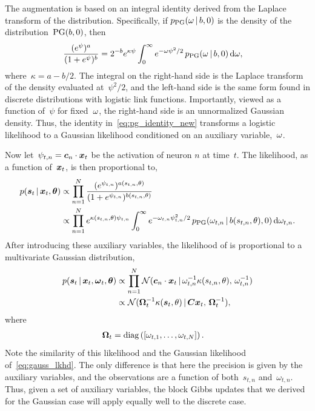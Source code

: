 The augmentation is based on an integral identity
derived from the Laplace transform of the \polyagamma distribution.
Specifically, if $p_{\mathrm{PG}}({\omega}\,|\, b, 0)$ is the
density of the \polyagamma distribution~${\mathrm{PG}(b, 0)}$,
then
\begin{align}
  \frac{(e^{\psi})^a}{(1+e^{\psi})^b}
  &= 2^{-b} e^{\kappa \psi}
  \int_{0}^{\infty} e^{-{\omega} \psi^2 /2} \,
  p_{\mathrm{PG}}({\omega} \,|\, b, 0) \, \mathrm{d}{\omega},
\label{eq:pg_identity_new}
\end{align}
where~${\kappa=a-b/2}$. The integral on the right-hand side is the
Laplace transform of the \polyagamma density evaluated at~$\psi^2/2$,
and the left-hand side is the same form found in discrete
distributions with logistic link functions.  Importantly, viewed as a
function of~$\psi$ for fixed~${\omega}$, the right-hand side is an
unnormalized Gaussian density.  Thus, the identity
in~\eqref{eq:pg_identity_new} transforms a logistic likelihood to a
Gaussian likelihood conditioned on an auxiliary variable,~${\omega}$.

Now let~$\psi_{t,n} = \boldsymbol{c}_n \cdot \boldsymbol{x}_t$ be the activation of neuron
$n$ at time~$t$. The likelihood, as a function of~$\boldsymbol{x}_t$, is then
proportional to,
\begin{align*}
  p(\boldsymbol{s}_t \,|\, \boldsymbol{x}_t, \boldsymbol{\theta})
  &\propto \prod_{n=1}^N 
  \frac{(e^{\psi_{t,n}})^{a(s_{t,n}, \theta)}}
       {(1+e^{\psi_{t,n}})^{b(s_{t,n}, \theta)}} \\
  &\propto \prod_{n=1}^N 
     e^{\kappa(s_{t,n}, \theta) \psi_{t,n}}
  \int_{0}^{\infty} e^{-{\omega}_{t,n} \psi_{t,n}^2 /2} \,
  p_{\mathrm{PG}}({\omega}_{t,n} \,|\, b(s_{t,n}, \theta), 0) \,
  \mathrm{d}{\omega}_{t,n}.
\end{align*}
After introducing these auxiliary variables, the likelihood
of is proportional to a multivariate Gaussian distribution,
\begin{align*}
  p(\boldsymbol{s}_t \,|\, \boldsymbol{x}_t, \boldsymbol{\omega}_t, \boldsymbol{\theta})
  &\propto \prod_{n=1}^N
  \mathcal{N}(\boldsymbol{c}_n \cdot \boldsymbol{x}_t \,|\,
  \omega_{t,n}^{-1} \kappa(s_{t,n}, \theta), \,
  \omega_{t,n}^{-1}) \\
  &\propto \mathcal{N}(
  \boldsymbol{\Omega}_t^{-1} \kappa(\boldsymbol{s}_t, \theta) \,|\,
  \boldsymbol{C} \boldsymbol{x}_t, \, 
  \boldsymbol{\Omega}_t^{-1}),
\end{align*}
where
\begin{align*}
  \boldsymbol{\Omega}_t &= \mathrm{diag} \left( \left[ \omega_{t,1}, \ldots, \omega_{t,N} \right] \right).
\end{align*}
Note the similarity of this likelihood and the Gaussian likelihood
of~\eqref{eq:gauss_lkhd}. The only difference is that here the
precision is given by the auxiliary variables, and the observations
are a function of both~$s_{t,n}$ and~$\omega_{t,n}$.
Thus, given a set of \polyagamma auxiliary variables, the block Gibbs
updates that we derived for the Gaussian case will apply equally well
to the discrete case.



